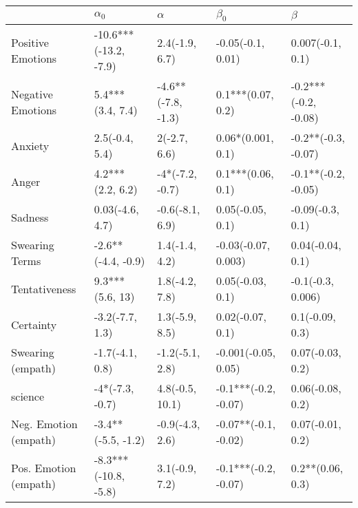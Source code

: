 \begin{tabular}{lllll}
\toprule
{} &             $\alpha_0$ &            $\alpha$ &             $\beta_0$ &               $\beta$ \\
\midrule
Positive Emotions     &  -10.6***(-13.2, -7.9) &      2.4(-1.9, 6.7) &     -0.05(-0.1, 0.01) &      0.007(-0.1, 0.1) \\
Negative Emotions     &       5.4***(3.4, 7.4) &  -4.6**(-7.8, -1.3) &     0.1***(0.07, 0.2) &  -0.2***(-0.2, -0.08) \\
Anxiety               &         2.5(-0.4, 5.4) &        2(-2.7, 6.6) &     0.06*(0.001, 0.1) &   -0.2**(-0.3, -0.07) \\
Anger                 &       4.2***(2.2, 6.2) &     -4*(-7.2, -0.7) &     0.1***(0.06, 0.1) &   -0.1**(-0.2, -0.05) \\
Sadness               &        0.03(-4.6, 4.7) &     -0.6(-8.1, 6.9) &      0.05(-0.05, 0.1) &      -0.09(-0.3, 0.1) \\
Swearing Terms        &     -2.6**(-4.4, -0.9) &      1.4(-1.4, 4.2) &   -0.03(-0.07, 0.003) &      0.04(-0.04, 0.1) \\
Tentativeness         &        9.3***(5.6, 13) &      1.8(-4.2, 7.8) &      0.05(-0.03, 0.1) &     -0.1(-0.3, 0.006) \\
Certainty             &        -3.2(-7.7, 1.3) &      1.3(-5.9, 8.5) &      0.02(-0.07, 0.1) &       0.1(-0.09, 0.3) \\
Swearing (empath)     &        -1.7(-4.1, 0.8) &     -1.2(-5.1, 2.8) &   -0.001(-0.05, 0.05) &      0.07(-0.03, 0.2) \\
science               &        -4*(-7.3, -0.7) &     4.8(-0.5, 10.1) &  -0.1***(-0.2, -0.07) &      0.06(-0.08, 0.2) \\
Neg. Emotion (empath) &     -3.4**(-5.5, -1.2) &     -0.9(-4.3, 2.6) &  -0.07**(-0.1, -0.02) &      0.07(-0.01, 0.2) \\
Pos. Emotion (empath) &   -8.3***(-10.8, -5.8) &      3.1(-0.9, 7.2) &  -0.1***(-0.2, -0.07) &      0.2**(0.06, 0.3) \\
\bottomrule
\end{tabular}
